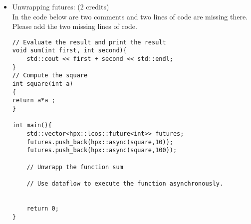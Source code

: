 \documentclass[11pt]{article}
\begin{document}
\begin{enumerate}
\begin{itemize}
\item Unwrapping futures: (2 credits)\\
In the code below are two comments and two lines of code are missing there. Please add the two missing lines of code.
\begin{lstlisting}
// Evaluate the result and print the result
void sum(int first, int second){
	std::cout << first + second << std::endl;
}
// Compute the square 
int square(int a)
{
return a*a ;
}

int main(){
	std::vector<hpx::lcos::future<int>> futures;
	futures.push_back(hpx::async(square,10));
	futures.push_back(hpx::async(square,100));
	
	// Unwrapp the function sum
	
	// Use dataflow to execute the function asynchronously.
	
		
	return 0;
}
\end{lstlisting} 
\end{itemize}


\end{enumerate}
\doclicenseThis 
\end{document}
